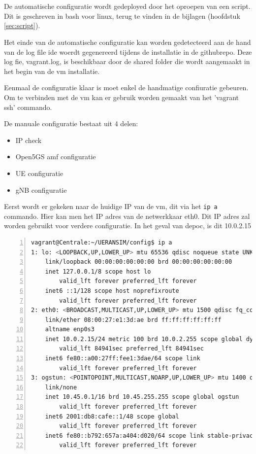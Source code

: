 \section{}%
\label{sec:Config}%

De automatische configuratie wordt gedeployed door het oproepen van een script. Dit is geschreven in bash voor linux, terug te vinden in de bijlagen (hoofdstuk \ref{sec:script}).

Het einde van de automatische configuratie kan worden gedetecteerd aan de hand van de log file ide woerdt gegenereerd tijdens de installatie in de githubrepo. Deze log fie, vagrant.log, is beschikbaar door de shared folder die wordt aangemaakt in het begin van de \gls{vm} installatie. 

Eenmaal de configuratie klaar is moet enkel de handmatige confiuratie gebeuren.
Om te verbinden met de \gls{vm} kan er gebruik worden gemaakt van het 'vagrant ssh' commando.

De manuale configuratie bestaat uit 4 delen:

\begin{itemize}
    \item IP check
    \item Open5GS \gls{amf} configuratie
    \item UE configuratie
    \item gNB configuratie
\end{itemize}

Eerst wordt er gekeken naar de huidige IP van de \gls{vm}, dit via het \verb|ip a| commando. Hier kan men het IP adres van de netwerkkaar eth0. Dit IP adres zal worden gebruikt voor verdere configuratie. In het geval van de\gls{poc}, is dit 10.0.2.15

\begin{lstlisting}[basicstyle=\small, frame=single, breaklines=true, postbreak=\mbox{\textcolor{red}{$\hookrightarrow$}\space}, escapeinside ={\%,}, escapechar={!}, numbers=left, language=sh, caption=IP configuratie]
vagrant@Centrale:~/UERANSIM/config$ ip a
1: lo: <LOOPBACK,UP,LOWER_UP> mtu 65536 qdisc noqueue state UNKNOWN group default qlen 1000
    link/loopback 00:00:00:00:00:00 brd 00:00:00:00:00:00
    inet 127.0.0.1/8 scope host lo
        valid_lft forever preferred_lft forever
    inet6 ::1/128 scope host noprefixroute
        valid_lft forever preferred_lft forever
2: eth0: <BROADCAST,MULTICAST,UP,LOWER_UP> mtu 1500 qdisc fq_codel state UP group default qlen 1000
    link/ether 08:00:27:e1:3d:ae brd ff:ff:ff:ff:ff:ff
    altname enp0s3
    inet 10.0.2.15/24 metric 100 brd 10.0.2.255 scope global dynamic eth0
        valid_lft 84941sec preferred_lft 84941sec
    inet6 fe80::a00:27ff:fee1:3dae/64 scope link
        valid_lft forever preferred_lft forever
3: ogstun: <POINTOPOINT,MULTICAST,NOARP,UP,LOWER_UP> mtu 1400 qdisc fq_codel state UP group default qlen 500
    link/none
    inet 10.45.0.1/16 brd 10.45.255.255 scope global ogstun
        valid_lft forever preferred_lft forever
    inet6 2001:db8:cafe::1/48 scope global
        valid_lft forever preferred_lft forever
    inet6 fe80::b792:657a:a404:d020/64 scope link stable-privacy
        valid_lft forever preferred_lft forever
\end{lstlisting}

